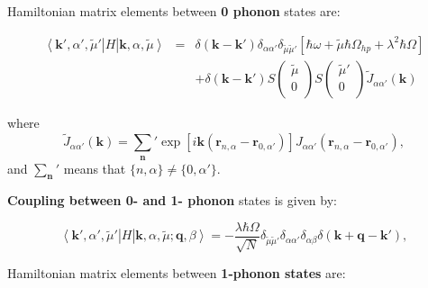 \documentclass[pt12]{article}
\newcommand{\bfk}{\mathbf{k}}
\newcommand{\bfq}{\mathbf{q}}
\newcommand{\bfr}{\mathbf{r}}
\newcommand{\bfn}{\mathbf{n}}
\newcommand{\tmu}{\tilde{\mu}}
\begin{document}
Hamiltonian matrix elements between
\textbf{0 phonon} states are:

\begin{eqnarray}\label{1P_H_1P}
\left< \bfk',\alpha',\tmu'\right| H \left|\bfk,\alpha,\tmu\right>
&=& \delta (\bfk-\bfk') \delta_{\alpha\alpha'} \delta_{\tmu\tmu'}
\left[\hbar \omega+\tmu \hbar \Omega_{hp}+\lambda^2 \hbar \Omega
\right] \\ \nonumber && + \delta (\bfk-\bfk') S\left(
                                \begin{array}{c}
                                    \tmu \\
                                    0 \\
                                  \end{array}
                                \right)
S\left(
                                \begin{array}{c}
                                    \tmu' \\
                                    0 \\
                                  \end{array}
                                \right)
\tilde{J}_{\alpha\alpha'}(\bfk)
\end{eqnarray}

where
\begin{equation}\label{Jk}
\tilde{J}_{\alpha\alpha'}(\bfk)=\sum_{\bfn}{}'
\exp\left[i\bfk(\bfr_{n,\alpha}-\bfr_{0,\alpha'})\right]
J_{\alpha\alpha'}(\bfr_{n,\alpha}-\bfr_{0,\alpha'}),
\end{equation}
and $\sum_{\bfn}{}'$ means that $\{n,\alpha\} \neq \{0,\alpha'\}$.

\textbf{Coupling between 0- and 1- phonon} states is given by:

\begin{equation}\label{1P_H_2P}
\left< \bfk',\alpha',\tmu'\right| H \left|\bfk,\alpha,\tmu; \bfq,
\beta\right> =
-\frac{\lambda\hbar\Omega}{\sqrt{N}}\delta_{\tmu\tmu'}\delta_{\alpha\alpha'}\delta_{\alpha\beta}
\delta(\bfk+\bfq-\bfk'),
\end{equation}

Hamiltonian matrix elements between \textbf{1-phonon states} are:
\end{document}
